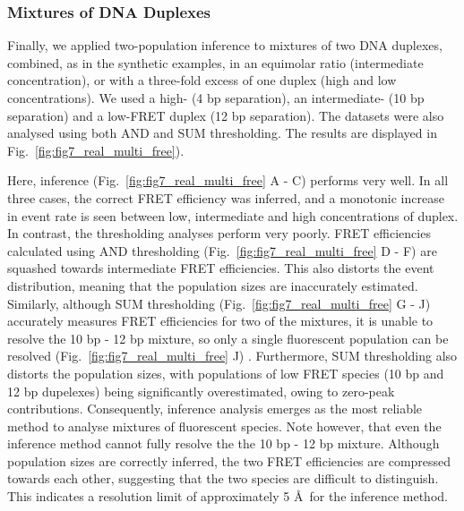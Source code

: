 \subsubsection*{Mixtures of DNA Duplexes}
Finally, we applied two-population inference to mixtures of two DNA duplexes, combined, as in the synthetic examples, in an equimolar ratio (intermediate concentration), or with a three-fold excess of one duplex (high and low concentrations). We used a high- (4 bp separation), an intermediate- (10 bp separation) and a low-FRET duplex (12 bp separation). The datasets were also analysed using both AND and SUM thresholding. The results are displayed in Fig.~\ref{fig:fig7_real_multi_free}). 

Here, inference (Fig.~\ref{fig:fig7_real_multi_free} A - C) performs very well. In all three cases, the correct FRET efficiency was inferred, and a monotonic increase in event rate is seen between low, intermediate and high concentrations of duplex. In contrast, the thresholding analyses perform very poorly. FRET efficiencies calculated using AND thresholding (Fig.~\ref{fig:fig7_real_multi_free} D - F) are squashed towards intermediate FRET efficiencies. This also distorts the event distribution, meaning that the population sizes are inaccurately estimated. Similarly, although SUM thresholding (Fig.~\ref{fig:fig7_real_multi_free} G - J) accurately measures FRET efficiencies for two of the mixtures, it is unable to resolve the 10 bp - 12 bp mixture, so only a single fluorescent population can be resolved (Fig.~\ref{fig:fig7_real_multi_free} J) . Furthermore, SUM thresholding also distorts the population sizes, with populations of low FRET species (10 bp and 12 bp dupelexes) being significantly overestimated, owing to zero-peak contributions. Consequently, inference analysis emerges as the most reliable method to analyse mixtures of fluorescent species. Note however, that even the inference method cannot fully resolve the the 10 bp - 12 bp mixture. Although population sizes are correctly inferred, the two FRET efficiencies are compressed towards each other, suggesting that the two species are difficult to distinguish. This indicates a resolution limit of approximately 5 \AA~for the inference method.    

